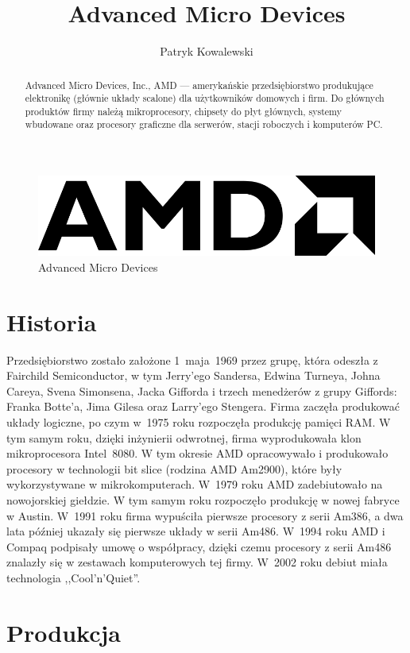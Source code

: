 \documentclass[a4paper,12pt]{article}
\title{Advanced Micro Devices}
\author{Patryk Kowalewski}
\begin{document}
\maketitle

\begin{abstract}\noindent Advanced Micro Devices, Inc., AMD --- amerykańskie przedsiębiorstwo produkujące elektronikę (głównie układy scalone) dla użytkowników domowych i firm. Do głównych produktów firmy należą mikroprocesory, chipsety do płyt głównych, systemy wbudowane oraz procesory graficzne dla serwerów, stacji roboczych i komputerów PC.
\end{abstract}

\begin{figure}[h]
\centering
\includegraphics[width=0.3\hsize]{amd.png}
\caption{Advanced Micro Devices}\label{AMD}
\end{figure}

\section{Historia}

Przedsiębiorstwo zostało założone 1~maja~1969 przez grupę, która odeszła z Fairchild Semiconductor, w tym Jerry’ego Sandersa, Edwina Turneya, Johna Careya, Svena Simonsena, Jacka Gifforda i trzech menedżerów z grupy Giffords: Franka Botte’a, Jima Gilesa oraz Larry’ego Stengera. Firma zaczęła produkować układy logiczne, po czym w~1975 roku rozpoczęła produkcję pamięci RAM. W tym samym roku, dzięki inżynierii odwrotnej, firma wyprodukowała klon mikroprocesora Intel~8080. W tym okresie AMD opracowywało i produkowało procesory w technologii bit slice (rodzina AMD Am2900), które były wykorzystywane w mikrokomputerach. W~1979 roku AMD zadebiutowało na nowojorskiej giełdzie. W tym samym roku rozpoczęło produkcję w nowej fabryce w Austin.
W~1991 roku firma wypuściła pierwsze procesory z serii Am386, a dwa lata później ukazały się pierwsze układy w serii Am486. W~1994 roku AMD i Compaq podpisały umowę o współpracy, dzięki czemu procesory z serii Am486 znalazły się w zestawach komputerowych tej firmy. W~2002 roku debiut miała technologia ,,Cool’n'Quiet''.

\section{Produkcja}
\end{document}
